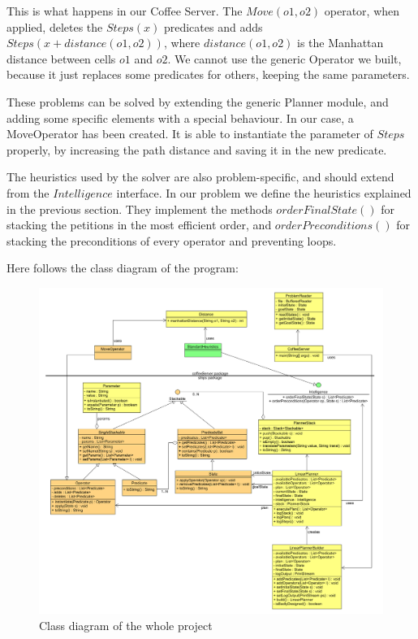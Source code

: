 \documentclass[12pt,a4paper,oneside]{article}
\numberwithin{equation}{section}
\numberwithin{equation}{section}
\theoremstyle{definition}
\begin{document}
This is what happens in our Coffee Server. The $Move(o1,o2)$ operator, when applied, deletes the $Steps(x)$ predicates and adds $Steps(x + distance(o1,o2))$, where $distance(o1,o2)$ is the Manhattan distance between cells $o1$ and $o2$. We cannot use the generic Operator we built, because it just replaces some predicates for others, keeping the same parameters.

These problems can be solved by extending the generic Planner module, and adding some specific elements with a special behaviour. In our case, a MoveOperator has been created. It is able to instantiate the parameter of $Steps$ properly, by increasing the path distance and saving it in the new predicate.

The heuristics used by the solver are also problem-specific, and should extend from the $Intelligence$ interface. In our problem we define the heuristics explained in the previous section. They implement the methods $orderFinalState()$ for stacking the petitions in the most efficient order, and $orderPreconditions()$ for stacking the preconditions of every operator and preventing loops.

Here follows the class diagram of the program:

\begin{figure}[H]
	\centering
	\includegraphics[scale=0.35]{figures/class_diagram.png}
	\caption{Class diagram of the whole project}
	\label{class_d} 
\end{figure}
\end{document}
